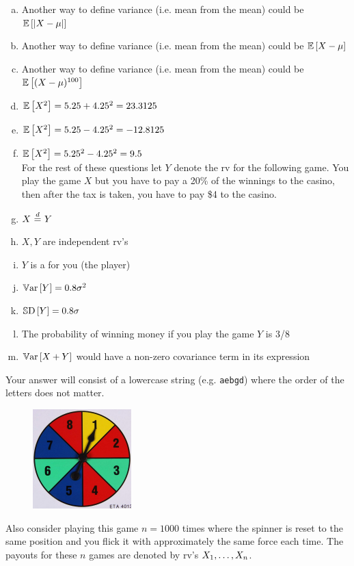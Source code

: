 \documentclass[12pt,landscape]{article}
\newcommand{\instr}{\small Your answer will consist of a lowercase string (e.g. \texttt{aebgd}) where the order of the letters does not matter. \normalsize}
\begin{document}
\vspace{-0.2cm}\benum{} 
\begin{enumerate}[(a)]
\item Another way to define variance (i.e. mean  from the mean) could be $\mathbb{E}\left[\left|X - \mu\right|\right]$
\item Another way to define variance (i.e. mean  from the mean) could be $\mathbb{E}\left[X - \mu\right]$
\item Another way to define variance (i.e. mean  from the mean) could be $\mathbb{E}\left[(X - \mu)^{100}\right]$
\item $\mathbb{E}\left[X^2\right] = 5.25 + 4.25^2 = 23.3125$
\item $\mathbb{E}\left[X^2\right] = 5.25 - 4.25^2 = -12.8125$
\item $\mathbb{E}\left[X^2\right] = 5.25^2 - 4.25^2 = 9.5$\\

For the rest of these questions let $Y$ denote the rv for the following game. You play the game $X$ but you have to pay a 20\% of the winnings to the casino, then after the tax is taken, you have to pay \$4 to the casino.

\item $X \equalsindist Y$
\item $X, Y$ are independent rv's
\item $Y$ is a  for you (the player)
\item $\mathbb{V}\text{ar}\left[Y\right] = 0.8\sigma^2$
\item $\mathbb{S}\text{D}\left[Y\right] = 0.8\sigma$
\item The probability of winning money if you play the game $Y$ is 3/8
\item $\mathbb{V}\text{ar}\left[X + Y\right]$ would have a non-zero covariance term in its expression
\end{enumerate}
\eenum\instr\pagebreak

\begin{figure}
\includegraphics[width=1.5in]{spinner.png}
\end{figure} \problem{}  Also consider playing this game $n = 1000$ times where the spinner is reset to the same position and you flick it with approximately the same force each time. The payouts for these $n$ games are denoted by rv's $X_1, \ldots, X_n$.
\end{document}
